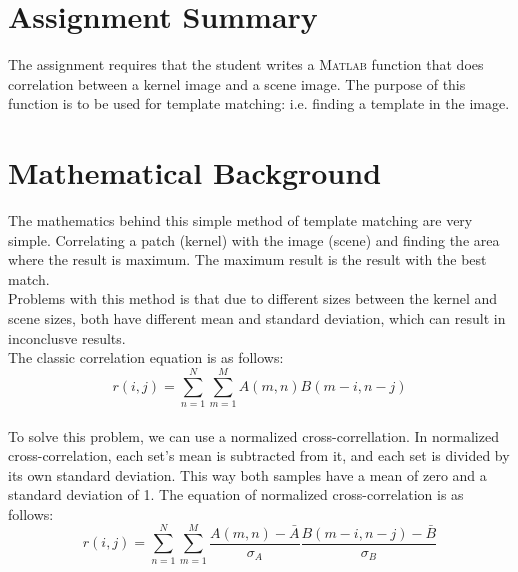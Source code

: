 \documentclass[letterpaper,11pt]{texMemo} %
\begin{document}
\maketitle %


\section{Assignment Summary}
The assignment requires that the student writes a \textsc{Matlab} function that does correlation between a kernel image and a scene image. The purpose of this function is to be used for template matching: i.e. finding a template in the image.

\section{Mathematical Background}
The mathematics behind this simple method of template matching are very simple. Correlating a patch (kernel) with the image (scene) and finding the area where the result is maximum. The maximum result is the result with the best match.\\
Problems with this method is that due to different sizes between the kernel and scene sizes, both have different mean and standard deviation, which can result in inconclusve results.\\
The classic correlation equation is as follows:\\
\begin{equation}
r(i,j) = \sum_{n=1}^{N} \sum_{m=1}^{M} A(m,n)B(m-i,n-j)
\end{equation}\\

To solve this problem, we can use a normalized cross-correllation. In normalized cross-correlation, each set's mean is subtracted from it, and each set is divided by its own standard deviation. This way both samples have a mean of zero and a standard deviation of 1. The equation of normalized cross-correlation is as follows:\\

\begin{equation}
r(i,j) = \sum_{n=1}^{N} \sum_{m=1}^{M} \frac{A(m,n)-\bar{A}}{\sigma_{A}}\frac{B(m-i,n-j)-\bar{B}}{\sigma_{B}}
\end{equation}\\
\end{document}
